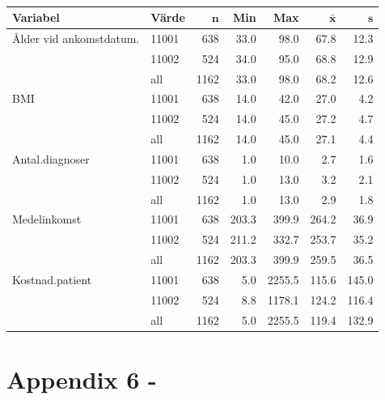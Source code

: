 \begin{table}[ht]
\centering
{\footnotesize
\begin{tabular}{llrrrrr}
 \textbf{Variabel} & \textbf{Värde} & $\mathbf{n}$ & \textbf{Min} & \textbf{Max} & $\mathbf{\bar{x}}$ & $\mathbf{s}$ \\ 
  \hline
Ålder vid ankomstdatum. & 11001 &  638 &  33.0 &   98.0 &  67.8 &  12.3 \\ 
   & 11002 &  524 &  34.0 &   95.0 &  68.8 &  12.9 \\ 
   \hline
 & all & 1162 &  33.0 &   98.0 &  68.2 &  12.6 \\ 
   \hline
BMI & 11001 &  638 &  14.0 &   42.0 &  27.0 &   4.2 \\ 
   & 11002 &  524 &  14.0 &   45.0 &  27.2 &   4.7 \\ 
   \hline
 & all & 1162 &  14.0 &   45.0 &  27.1 &   4.4 \\ 
   \hline
Antal.diagnoser & 11001 &  638 &   1.0 &   10.0 &   2.7 &   1.6 \\ 
   & 11002 &  524 &   1.0 &   13.0 &   3.2 &   2.1 \\ 
   \hline
 & all & 1162 &   1.0 &   13.0 &   2.9 &   1.8 \\ 
   \hline
Medelinkomst & 11001 &  638 & 203.3 &  399.9 & 264.2 &  36.9 \\ 
   & 11002 &  524 & 211.2 &  332.7 & 253.7 &  35.2 \\ 
   \hline
 & all & 1162 & 203.3 &  399.9 & 259.5 &  36.5 \\ 
   \hline
Kostnad.patient & 11001 &  638 &   5.0 & 2255.5 & 115.6 & 145.0 \\ 
   & 11002 &  524 &   8.8 & 1178.1 & 124.2 & 116.4 \\ 
   \hline
 & all & 1162 &   5.0 & 2255.5 & 119.4 & 132.9 \\ 
   \hline
\end{tabular}
}
\caption{} 
\label{}
\end{table}

\newpage
\section{Appendix 6 - }

